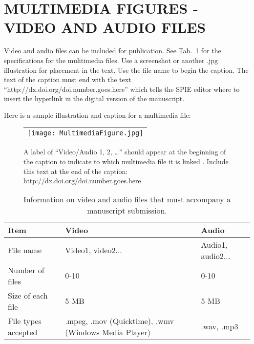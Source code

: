 \documentclass[]{spie}  %
\providecommand{\DIFaddend}{} %
\DeclareRobustCommand{\DIFaddend}{\DIFOaddend \let\includegraphics\DIFOincludegraphics} %
\begin{document}
\DIFaddend \section{MULTIMEDIA FIGURES - VIDEO AND AUDIO FILES}

Video and audio files can be included for publication. See Tab.~\ref{tab:Multimedia-Specifications} for the specifications for the mulitimedia files. Use a screenshot or another .jpg illustration for placement in the text. Use the file name to begin the caption. The text of the caption must end with the text ``http://dx.doi.org/doi.number.goes.here'' which tells the SPIE editor where to insert the hyperlink in the digital version of the manuscript. 

Here is a sample illustration and caption for a multimedia file:

   \begin{figure} [ht]
   \begin{center}
   \begin{tabular}{c} 
   \texttt{[image: MultimediaFigure.jpg]}
	\end{tabular}
	\end{center}
   \caption[example] 
   { \label{fig:video-example} 
A label of “Video/Audio 1, 2, …” should appear at the beginning of the caption to indicate to which multimedia file it is linked . Include this text at the end of the caption: \url{http://dx.doi.org/doi.number.goes.here}}
   \end{figure} 

   \begin{table}[ht]
\caption{Information on video and audio files that must accompany a manuscript submission.} 
\label{tab:Multimedia-Specifications}
\begin{center}       
\begin{tabular}{|l|l|l|}
\hline
\rule[-1ex]{0pt}{3.5ex}  Item & Video & Audio  \\
\hline
\rule[-1ex]{0pt}{3.5ex}  File name & Video1, video2... & Audio1, audio2...   \\
\hline
\rule[-1ex]{0pt}{3.5ex}  Number of files & 0-10 & 0-10  \\
\hline
\rule[-1ex]{0pt}{3.5ex}  Size of each file & 5 MB & 5 MB  \\
\hline
\rule[-1ex]{0pt}{3.5ex}  File types accepted & .mpeg, .mov (Quicktime), .wmv (Windows Media Player) & .wav, .mp3  \\
\hline 
\end{tabular}
\end{center}
\end{table}
\end{document}

